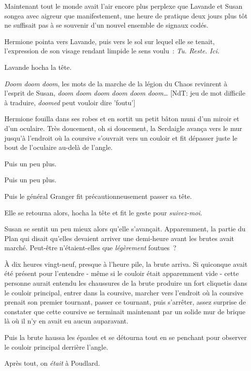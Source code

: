 Maintenant tout le monde avait l'air encore plus perplexe que Lavande et Susan songea avec aigreur que manifestement, une heure de pratique deux jours plus tôt ne suffisait pas à se souvenir d'un nouvel ensemble de signaux codés.

Hermione pointa vers Lavande, puis vers le sol sur lequel elle se tenait, l'expression de son visage rendant limpide le sens voulu~: \emph{Tu. Reste. Ici.}

Lavande hocha la tête.

\emph{Doom doom doom}, les mots de la marche de la légion du Chaos revinrent à l'esprit de Susan, \emph{doom doom doom doom doom doom…} {[}NdT: jeu de mot difficile à traduire, \emph{doomed} peut vouloir dire 'foutu'{]}

Hermione fouilla dans ses robes et en sortit un petit bâton muni d'un miroir et d'un oculaire. Très doucement, oh si doucement, la Serdaigle avança vers le mur jusqu'à l'endroit où la coursive s'ouvrait vers un couloir et fit dépasser juste le bout de l'oculaire au-delà de l'angle.

Puis un peu plus.

Puis un peu plus.

Puis le général Granger fit précautionneusement passer sa tête.

Elle se retourna alors, hocha la tête et fit le geste pour \emph{suivez-moi}.

Susan se sentit un peu mieux alors qu'elle s'avançait. Apparemment, la partie du Plan qui disait qu'elles devaient arriver une demi-heure avant les brutes avait marché. Peut-être n'étaient-elles que \emph{légèrement} foutues~?

\later

À dix heures vingt-neuf, presque à l'heure pile, la brute arriva. Si quiconque avait été présent pour l'entendre - même si le couloir était apparemment vide - cette personne aurait entendu les chaussures de la brute produire un fort cliquetis dans le couloir principal, entrer dans la coursive, marcher vers l'endroit où la coursive prenait son premier tournant, passer ce tournant, puis s'arrêter, assez surprise de constater que cette coursive se terminait maintenant par un solide mur de brique là où il n'y en avait eu aucun auparavant.

Puis la brute haussa les épaules et se détourna tout en se penchant pour observer le couloir principal derrière l'angle.

Après tout, on \emph{était} à Poudlard.


